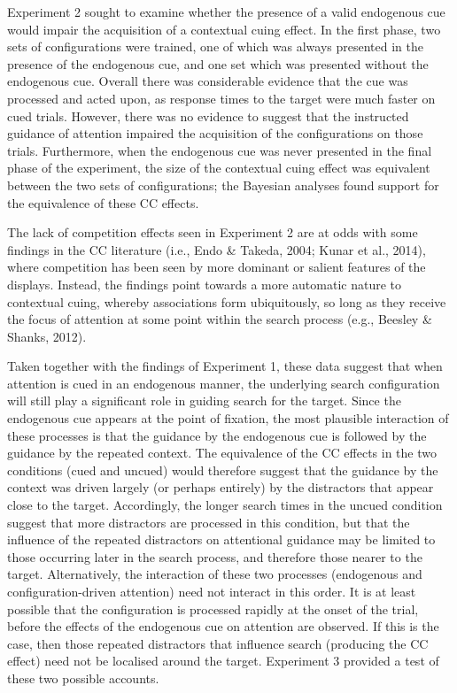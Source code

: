 \documentclass[
  man,
  floatsintext,
  longtable,
  nolmodern,
  notxfonts,
  notimes,
  colorlinks=true,linkcolor=blue,citecolor=blue,urlcolor=blue]{apa7}
\begin{document}
Experiment 2 sought to examine whether the presence of a valid
endogenous cue would impair the acquisition of a contextual cuing
effect. In the first phase, two sets of configurations were trained, one
of which was always presented in the presence of the endogenous cue, and
one set which was presented without the endogenous cue. Overall there
was considerable evidence that the cue was processed and acted upon, as
response times to the target were much faster on cued trials. However,
there was no evidence to suggest that the instructed guidance of
attention impaired the acquisition of the configurations on those
trials. Furthermore, when the endogenous cue was never presented in the
final phase of the experiment, the size of the contextual cuing effect
was equivalent between the two sets of configurations; the Bayesian
analyses found support for the equivalence of these CC effects.

The lack of competition effects seen in Experiment 2 are at odds with
some findings in the CC literature (i.e., Endo \& Takeda, 2004; Kunar et
al., 2014), where competition has been seen by more dominant or salient
features of the displays. Instead, the findings point towards a more
automatic nature to contextual cuing, whereby associations form
ubiquitously, so long as they receive the focus of attention at some
point within the search process (e.g., Beesley \& Shanks, 2012).

Taken together with the findings of Experiment 1, these data suggest
that when attention is cued in an endogenous manner, the underlying
search configuration will still play a significant role in guiding
search for the target. Since the endogenous cue appears at the point of
fixation, the most plausible interaction of these processes is that the
guidance by the endogenous cue is followed by the guidance by the
repeated context. The equivalence of the CC effects in the two
conditions (cued and uncued) would therefore suggest that the guidance
by the context was driven largely (or perhaps entirely) by the
distractors that appear close to the target. Accordingly, the longer
search times in the uncued condition suggest that more distractors are
processed in this condition, but that the influence of the repeated
distractors on attentional guidance may be limited to those occurring
later in the search process, and therefore those nearer to the target.
Alternatively, the interaction of these two processes (endogenous and
configuration-driven attention) need not interact in this order. It is
at least possible that the configuration is processed rapidly at the
onset of the trial, before the effects of the endogenous cue on
attention are observed. If this is the case, then those repeated
distractors that influence search (producing the CC effect) need not be
localised around the target. Experiment 3 provided a test of these two
possible accounts.
\end{document}
